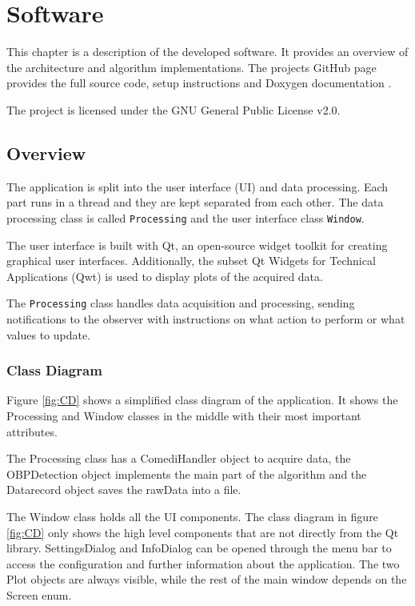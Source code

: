 \chapter{Software}\label{cp:sw}

This chapter is a description of the developed software. It provides an overview of the architecture and algorithm implementations. The projects GitHub page provides the full source code, setup instructions and Doxygen documentation \citep{Belinda2020}. %

The project is licensed under the GNU General Public License v2.0.

\section{Overview}
The application is split into the user interface (UI) and data processing. Each part runs in a thread and they are kept separated from each other. The data processing class is called \texttt{Processing} and the user interface class \texttt{Window}. 

The user interface is built with Qt, an open-source widget toolkit for creating graphical user interfaces. Additionally, the subset Qt Widgets for Technical Applications (Qwt) is used to display plots of the acquired data.

The \texttt{Processing} class handles data acquisition and processing, sending notifications to the observer with instructions on what action to perform or what values to update.

\subsection{Class Diagram}
Figure \ref{fig:CD} shows a simplified class diagram of the application. It shows the Processing and Window classes in the middle with their most important attributes. 

The Processing class has a ComediHandler object to acquire data, the OBPDetection object implements the main part of the algorithm and the Datarecord object saves the rawData into a file. 

The Window class holds all the UI components. The class diagram in figure \ref{fig:CD} only shows the high level components that are not directly from the Qt library. SettingsDialog and InfoDialog can be opened through the menu bar to access the configuration and further information about the application. The two Plot objects are always visible, while the rest of the main window depends on the Screen enum.

